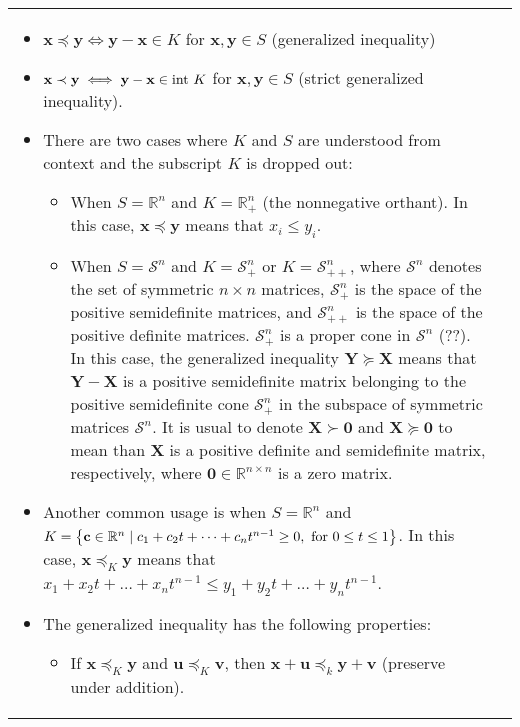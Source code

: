 \documentclass{article}
\begin{document}
\begin{table}[ht!]
\begin{tabularx}{\textwidth}{|A|C|}
\begin{itemize}[leftmargin=*]
    \item \(\mathbf{x} \preceq \mathbf{y} \iff \mathbf{y} - \mathbf{x} \in K\) for \(\mathbf{x}, \mathbf{y} \in S\) (generalized inequality)
    \item \(\mathbf{x} \prec \mathbf{y} \iff \mathbf{y} - \mathbf{x} \in \textnormal{int }K\) for \(\mathbf{x}, \mathbf{y} \in S\) (strict generalized inequality).
    \item There are two cases where \(K\) and \(S\) are understood from context and the subscript \(K\) is dropped out:
        \begin{itemize}[label={$\triangleright$}]
            \item When \(S = \mathbb{R}^{n}\) and \(K = \mathbb{R}^{n}_{+}\) (the nonnegative orthant). In this case, \(\mathbf{x} \preceq \mathbf{y}\) means that \(x_i \leq y_i\).
            \item When \(S = \mathcal{S}^{n}\) and \(K = \mathcal{S}^{n}_{+}\) or \(K = \mathcal{S}^{n}_{++}\), where \(\mathcal{S}^{n}\) denotes the set of symmetric \(n\times n\) matrices, \(\mathcal{S}^{n}_{+}\) is the space of the positive semidefinite matrices, and \(\mathcal{S}^{n}_{++}\) is the space of the positive definite matrices. \(\mathcal{S}^{n}_{+}\) is a proper cone in \(\mathcal{S}^{n}\) (??). In this case, the generalized inequality \(\mathbf{Y} \succeq \mathbf{X}\) means that \(\mathbf{Y}-\mathbf{X}\) is a positive semidefinite matrix belonging to the positive semidefinite cone \(\mathcal{S}^{n}_{+}\) in the subspace of symmetric matrices \(\mathcal{S}^{n}\). It is usual to denote \(\mathbf{X} \succ \mathbf{0}\) and \(\mathbf{X} \succeq \mathbf{0}\) to mean than \(\mathbf{X}\) is a positive definite and semidefinite matrix, respectively, where \(\mathbf{0} \in \mathbb{R}^{n\times n}\) is a zero matrix.
        \end{itemize}
    \item Another common usage is when \(S = \mathbb{R}^{n}\) and \(K = \left\{ \mathbf{c} \in \mathbb{R}^{n} \mid c_1 + c_2 t + \dots + c_n t^{n-1} \geq 0, \textnormal{ for } 0\leq t\leq 1 \right\}\). In this case, \(\mathbf{x} \preceq_K \mathbf{y}\) means that \(x_1 + x_2 t + \dots + x_n t^{n-1} \leq y_1 + y_2 t + \dots + y_n t^{n-1}\).
    \item The generalized inequality has the following properties:
        \begin{itemize}[label={$\triangleright$}]
            \item If \(\mathbf{x} \preceq_K \mathbf{y}\) and \(\mathbf{u} \preceq_K \mathbf{v}\), then \(\mathbf{x} + \mathbf{u} \preceq_k \mathbf{y} + \mathbf{v}\) (preserve under addition).

\end{itemize}
\end{itemize}
\end{tabularx}
\end{table}
\end{document}
